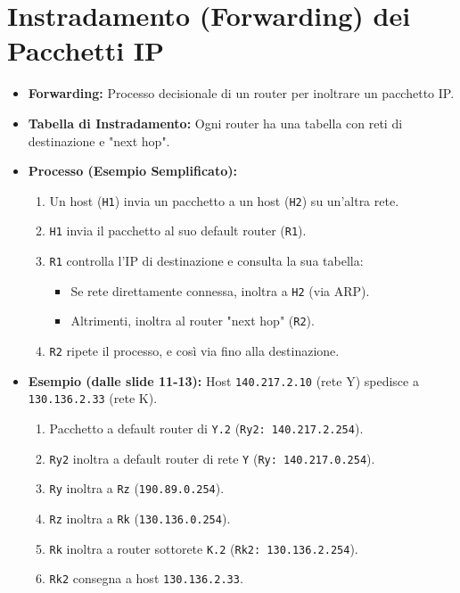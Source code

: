 \documentclass{article}
\begin{document}
\section{Instradamento (Forwarding) dei Pacchetti IP}
\begin{itemize}
    \item \textbf{Forwarding:} Processo decisionale di un router per inoltrare un pacchetto IP.
    \item \textbf{Tabella di Instradamento:} Ogni router ha una tabella con reti di destinazione e "next hop".
    \item \textbf{Processo (Esempio Semplificato):}
    \begin{enumerate}
        \item Un host (\texttt{H1}) invia un pacchetto a un host (\texttt{H2}) su un'altra rete.
        \item \texttt{H1} invia il pacchetto al suo default router (\texttt{R1}).
        \item \texttt{R1} controlla l'IP di destinazione e consulta la sua tabella:
        \begin{itemize}
            \item Se rete direttamente connessa, inoltra a \texttt{H2} (via ARP).
            \item Altrimenti, inoltra al router "next hop" (\texttt{R2}).
        \end{itemize}
        \item \texttt{R2} ripete il processo, e così via fino alla destinazione.
    \end{enumerate}
    \item \textbf{Esempio (dalle slide 11-13):} Host \texttt{140.217.2.10} (rete Y) spedisce a \texttt{130.136.2.33} (rete K).
    \begin{enumerate}
        \item Pacchetto a default router di \texttt{Y.2} (\texttt{Ry2: 140.217.2.254}).
        \item \texttt{Ry2} inoltra a default router di rete \texttt{Y} (\texttt{Ry: 140.217.0.254}).
        \item \texttt{Ry} inoltra a \texttt{Rz} (\texttt{190.89.0.254}).
        \item \texttt{Rz} inoltra a \texttt{Rk} (\texttt{130.136.0.254}).
        \item \texttt{Rk} inoltra a router sottorete \texttt{K.2} (\texttt{Rk2: 130.136.2.254}).
        \item \texttt{Rk2} consegna a host \texttt{130.136.2.33}.
    \end{enumerate}
\end{itemize}
\end{document}
